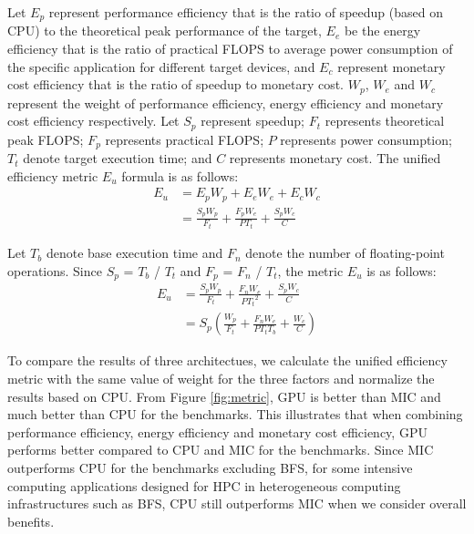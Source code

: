 Let $E_{p}$ represent performance efficiency that is the ratio of speedup (based on CPU) to the theoretical peak performance of the target, $E_{e}$ be the energy efficiency that is the ratio of practical FLOPS to average power consumption of the specific application for different target devices, and $E_{c}$ represent monetary cost efficiency that is the ratio of speedup to monetary cost. $W_{p}$, $W_{e}$ and $W_{c}$ represent the weight of performance efficiency, energy efficiency and monetary cost efficiency respectively. Let $S_{p}$ represent speedup; $F_{t}$ represents theoretical peak FLOPS; $F_{p}$ represents practical FLOPS; $P$ represents power consumption; $T_{t}$ denote target execution time; and $C$ represents monetary cost. The unified efficiency metric $E_{u}$ formula is as follows:
  \begin{equation}\label{equ:metric1}
    \begin{split}
  {E_{u}} &  = E_{p}W_{p}+E_{e}W_{e}+E_{c}W_{c} \\
   & = \frac{S_{p}W_{p}}{F_{t}}+\frac{F_{p}W_{e}}{PT_{t}}+\frac{S_{p}W_{c}}{C}
  \end{split}
\end{equation}
  
Let $T_{b}$ denote base execution time and $F_{n}$ denote the number of floating-point operations. Since $S_{p}$ = $T_{b}$ / $T_{t}$ and $F_{p}$ = $F_{n}$ / $T_{t}$, the metric $E_{u}$ is as follows:
  \begin{equation}\label{equ:metric1}
    \begin{split}
  {E_{u}} &  = \frac{S_{p}W_{p}}{F_{t}}+\frac{F_{n}W_{e}}{P{T_{t}}^2}+\frac{S_{p}W_{c}}{C} \\
   & = {S_{p}}(\frac{W_{p}}{F_{t}}+\frac{F_{n}W_{e}}{PT_{t}T_{b}}+\frac{W_{c}}{C})
  \end{split}
\end{equation}

  
 To compare the results of three architectues, we calculate the unified efficiency metric with the same value of weight for the three factors and normalize the results based on CPU. From Figure \ref{fig:metric}, GPU is better than MIC and much better than CPU for the benchmarks. This illustrates that when combining performance efficiency, energy efficiency and monetary cost efficiency, GPU performs better compared to CPU and MIC for the benchmarks. Since MIC outperforms CPU for the benchmarks excluding BFS, for some intensive computing applications designed for HPC in heterogeneous computing infrastructures such as BFS, CPU still outperforms MIC when we consider overall benefits.
